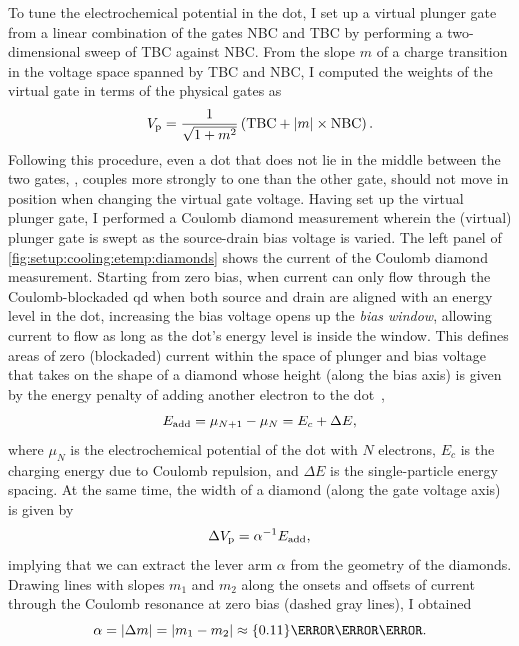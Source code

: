 To tune the electrochemical potential in the dot, I set up a virtual plunger gate~\cite{Botzem2018} from a linear combination of the gates NBC and TBC by performing a two-dimensional sweep of TBC against NBC\@.
From the slope $m$ of a charge transition in the voltage space spanned by TBC and NBC, I computed the weights of the virtual gate in terms of the physical gates as
\begin{equation}
    V_{\mathrm{p}} = \frac{1}{\sqrt{1 + m^2}}\left(\mathrm{TBC} + \abs{m}\times \mathrm{NBC}\right).
\end{equation}
Following this procedure, even a dot that does not lie in the middle between the two gates, \ie, couples more strongly to one than the other gate, should not move in position when changing the virtual gate voltage.
Having set up the virtual plunger gate, I performed a Coulomb diamond measurement wherein the (virtual) plunger gate is swept as the source-drain bias voltage is varied.
The left panel of \cref{fig:setup:cooling:etemp:diamonds} shows the current of the Coulomb diamond measurement.
Starting from zero bias, when current can only flow through the Coulomb-blockaded \gls{qd} when both source and drain are aligned with an energy level in the dot, increasing the bias voltage opens up the \emph{bias window}, allowing current to flow as long as the dot's energy level is inside the window.
This defines areas of zero (blockaded) current within the space of plunger and bias voltage that takes on the shape of a diamond whose height (along the bias axis) is given by the energy penalty of adding another electron to the dot~\cite{Ihn2009},
\begin{equation}
    E_{\mathrm{add}} = \mu_{N+1} - \mu_N = E_c + \Delta E,
\end{equation}
where $\mu_N$ is the electrochemical potential of the dot with $N$ electrons, $E_c$ is the charging energy due to Coulomb repulsion, and $\Delta E$ is the single-particle energy spacing.
At the same time, the width of a diamond (along the gate voltage axis) is given by
\begin{equation}
    \Delta V_{\mathrm{p}} = \alpha^{-1} E_{\mathrm{add}},
\end{equation}
implying that we can extract the lever arm $\alpha$ from the geometry of the diamonds.
Drawing lines with slopes $m_1$ and $m_2$ along the onsets and offsets of current through the Coulomb resonance at zero bias (dashed gray lines), I obtained
\begin{equation}
    \alpha = \abs{\Delta m} = \abs{m_1 - m_2} \approx\qty{0.11}{\eV\per\volt}.
\end{equation}


